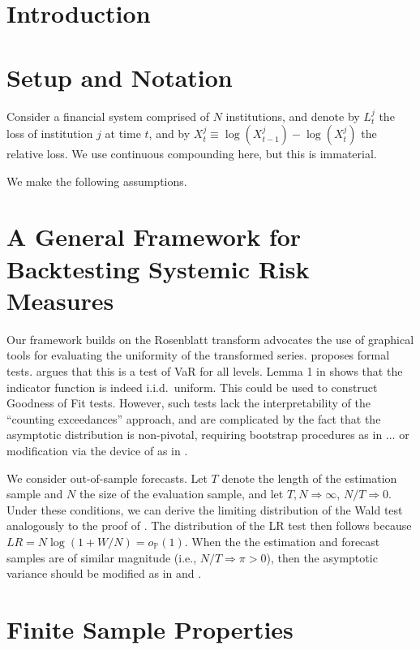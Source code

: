 \documentclass[12pt]{article}
\begin{document}
\newpage
{} %





\section{Introduction}
\section{Setup and Notation}
Consider a financial system comprised of $N$ institutions, and denote by $L^j_t$ the loss of institution $j$ at time $t$, and by $X^j_t\equiv \log(X^j_{t-1})-\log(X^j_t)$ the relative loss. We use continuous compounding here, but this is immaterial.

We make the following assumptions.
\section{A General Framework for Backtesting Systemic Risk Measures}
Our framework builds on the Rosenblatt transform \citep{rosenblatt:52}
\citet{diebold:98} advocates the use of graphical tools for evaluating the uniformity of the transformed series. \citet{berkowitz:01} proposes formal tests. \citet{campbell06} argues that this is a test of VaR for all levels.
Lemma 1 in \citet{bai:03} shows that the indicator function is indeed i.i.d.\ uniform. This could be used to construct Goodness of Fit tests. However, such tests lack the interpretability of the ``counting exceedances'' approach, and are complicated by the fact that the asymptotic distribution is non-pivotal, requiring bootstrap procedures as in ... or modification via the device of \citet{kh:81} as in \citet{bai:03}.


We consider out-of-sample forecasts. %
Let $T$ denote the length of the estimation sample and $N$ the size of the evaluation sample, and let $T, N \Rightarrow \infty$, $N/T\Rightarrow 0$. Under these conditions, we can derive the limiting distribution of the Wald test analogously to the proof of \citet[Theorem 5]{engle}. The distribution of the LR test then follows because $LR=N\log(1+W/N)=o_{\mathbb{P}}(1)$. When the the estimation and forecast samples are of similar magnitude (i.e., $N/T\Rightarrow\pi>0$), then the asymptotic variance should be modified as in \citet{mccracken} and \citet{eo:10}.
\section{Finite Sample Properties}
\end{document}
